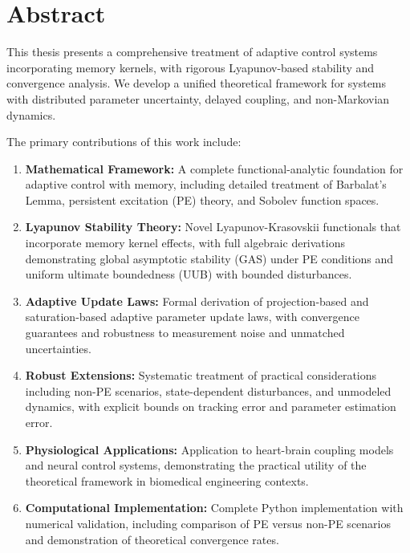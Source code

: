 \chapter*{Abstract}

This thesis presents a comprehensive treatment of adaptive control systems incorporating memory kernels, with rigorous Lyapunov-based stability and convergence analysis. We develop a unified theoretical framework for systems with distributed parameter uncertainty, delayed coupling, and non-Markovian dynamics.

The primary contributions of this work include:

\begin{enumerate}
    \item \textbf{Mathematical Framework:} A complete functional-analytic foundation for adaptive control with memory, including detailed treatment of Barbalat's Lemma, persistent excitation (PE) theory, and Sobolev function spaces.

    \item \textbf{Lyapunov Stability Theory:} Novel Lyapunov-Krasovskii functionals that incorporate memory kernel effects, with full algebraic derivations demonstrating global asymptotic stability (GAS) under PE conditions and uniform ultimate boundedness (UUB) with bounded disturbances.

    \item \textbf{Adaptive Update Laws:} Formal derivation of projection-based and saturation-based adaptive parameter update laws, with convergence guarantees and robustness to measurement noise and unmatched uncertainties.

    \item \textbf{Robust Extensions:} Systematic treatment of practical considerations including non-PE scenarios, state-dependent disturbances, and unmodeled dynamics, with explicit bounds on tracking error and parameter estimation error.

    \item \textbf{Physiological Applications:} Application to heart-brain coupling models and neural control systems, demonstrating the practical utility of the theoretical framework in biomedical engineering contexts.

    \item \textbf{Computational Implementation:} Complete Python implementation with numerical validation, including comparison of PE versus non-PE scenarios and demonstration of theoretical convergence rates.
\end{enumerate}


